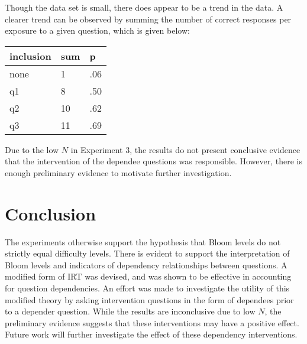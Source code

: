 \documentclass[a4paper,twocolumn]{article}
\begin{document}
Though the data set is small, there does appear to be a trend in the data. A
clearer trend can be observed by summing the number of correct responses per
exposure to a given question, which is given below:

\begin{center}
\begin{tabular}{|l|l|l|}
\hline
inclusion    & sum &  p   \\ \hline
none         &  1  & .06  \\ \hline
q1           &  8  & .50  \\ \hline
q2           & 10  & .62  \\ \hline
q3           & 11  & .69  \\ \hline
\end{tabular}
\end{center}

Due to the low $N$ in Experiment 3, the results do not present conclusive
evidence that the intervention of the dependee questions was responsible.
However, there is enough preliminary evidence to motivate further
investigation.

\section{Conclusion}

The experiments otherwise support the hypothesis that Bloom levels do not
strictly equal difficulty levels.  There is evident to support the
interpretation of Bloom levels and indicators of dependency relationships
between questions.  A modified form of IRT was devised, and was shown to be
effective in accounting for question dependencies.   An effort was made to
investigate the utility of this modified theory by asking intervention
questions in the form of dependees prior to a depender question.  While the
results are inconclusive due to low $N$, the preliminary evidence  suggests
that these interventions may have a positive effect.  Future work will
further investigate the effect of these dependency interventions.



\end{document}
